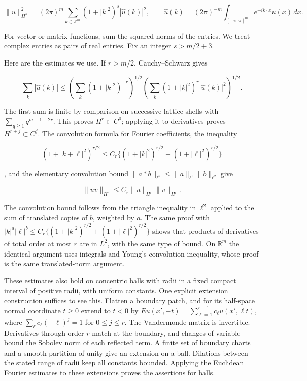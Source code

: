 \begin{equation}
\|u\|_{H^s}^2
=(2\pi)^m\sum_{k\in\mathbb Z^m}(1+|k|^2)^s|\widehat u(k)|^2,
\qquad
\widehat u(k)=(2\pi)^{-m}\int_{[-\pi,\pi]^m}e^{-ik\cdot x}u(x)\,dx.
\label{courseIII:almost-complex-structures-and-integrability:eq:7.1}
\end{equation}

For vector or matrix functions, sum the squared norms of the entries. We treat complex entries as pairs of real entries. Fix an integer \(s>m/2+3\).

Here are the estimates we use. If \(r>m/2\), Cauchy--Schwarz gives

\begin{equation}
\sum_k|\widehat u(k)|
\leq\left(\sum_k(1+|k|^2)^{-r}\right)^{1/2}
\left(\sum_k(1+|k|^2)^r|\widehat u(k)|^2\right)^{1/2}.
\label{courseIII:almost-complex-structures-and-integrability:eq:7.2}
\end{equation}

The first sum is finite by comparison on successive lattice shells with \(\sum_{q\geq1}q^{m-1-2r}\). This proves \(H^r\subset C^0\); applying it to derivatives proves \(H^{r+j}\subset C^j\). The convolution formula for Fourier coefficients, the inequality

\[
(1+|k+\ell|^2)^{r/2}\leq C_r\{(1+|k|^2)^{r/2}+(1+|\ell|^2)^{r/2}\}
\]

,
and the elementary convolution bound \(\|a*b\|_{\ell^2}\leq\|a\|_{\ell^1}\|b\|_{\ell^2}\) give

\begin{equation}
\|uv\|_{H^r}\leq C_r\|u\|_{H^r}\|v\|_{H^r}.
\label{courseIII:almost-complex-structures-and-integrability:eq:7.3}
\end{equation}

The convolution bound follows from the triangle inequality in \(\ell^2\) applied to the sum of translated copies of \(b\), weighted by \(a\). The same proof with
\(|k|^a|\ell|^b\leq C_r\{(1+|k|^2)^{r/2}+(1+|\ell|^2)^{r/2}\}\)
shows that products of derivatives of total order at most \(r\) are in \(L^2\), with the same type of bound. On \(\mathbb R^m\) the identical argument uses integrals and Young's convolution inequality, whose proof is the same translated-norm argument.

These estimates also hold on concentric balls with radii in a fixed compact interval of positive radii, with uniform constants. One explicit extension construction suffices to see this. Flatten a boundary patch, and for its half-space normal coordinate \(t\geq0\) extend to \(t<0\) by
\(Eu(x',-t)=\sum_{\ell=1}^{r+1}c_\ell u(x',\ell t)\),
where \(\sum_\ell c_\ell(-\ell)^j=1\) for \(0\leq j\leq r\). The Vandermonde matrix is invertible. Derivatives through order \(r\) match at the boundary, and changes of variable bound the Sobolev norm of each reflected term. A finite set of boundary charts and a smooth partition of unity give an extension on a ball. Dilations between the stated range of radii keep all constants bounded. Applying the Euclidean Fourier estimates to these extensions proves the assertions for balls.

